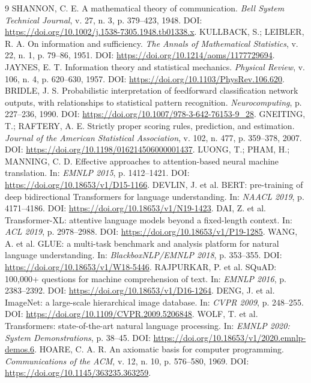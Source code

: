 \begin{thebibliography}{9}
 SHANNON, C. E. A mathematical theory of communication. \textit{Bell System Technical Journal}, v. 27, n. 3, p. 379--423, 1948. DOI: \url{https://doi.org/10.1002/j.1538-7305.1948.tb01338.x}.
 KULLBACK, S.; LEIBLER, R. A. On information and sufficiency. \textit{The Annals of Mathematical Statistics}, v. 22, n. 1, p. 79--86, 1951. DOI: \url{https://doi.org/10.1214/aoms/1177729694}.
 JAYNES, E. T. Information theory and statistical mechanics. \textit{Physical Review}, v. 106, n. 4, p. 620--630, 1957. DOI: \url{https://doi.org/10.1103/PhysRev.106.620}.
 BRIDLE, J. S. Probabilistic interpretation of feedforward classification network outputs, with relationships to statistical pattern recognition. \textit{Neurocomputing}, p. 227--236, 1990. DOI: \url{https://doi.org/10.1007/978-3-642-76153-9_28}.
 GNEITING, T.; RAFTERY, A. E. Strictly proper scoring rules, prediction, and estimation. \textit{Journal of the American Statistical Association}, v. 102, n. 477, p. 359--378, 2007. DOI: \url{https://doi.org/10.1198/016214506000001437}.
 LUONG, T.; PHAM, H.; MANNING, C. D. Effective approaches to attention-based neural machine translation. In: \textit{EMNLP 2015}, p. 1412--1421. DOI: \url{https://doi.org/10.18653/v1/D15-1166}.
 DEVLIN, J. et al. BERT: pre-training of deep bidirectional Transformers for language understanding. In: \textit{NAACL 2019}, p. 4171--4186. DOI: \url{https://doi.org/10.18653/v1/N19-1423}.
 DAI, Z. et al. Transformer-XL: attentive language models beyond a fixed-length context. In: \textit{ACL 2019}, p. 2978--2988. DOI: \url{https://doi.org/10.18653/v1/P19-1285}.
 WANG, A. et al. GLUE: a multi-task benchmark and analysis platform for natural language understanding. In: \textit{BlackboxNLP/EMNLP 2018}, p. 353--355. DOI: \url{https://doi.org/10.18653/v1/W18-5446}.
 RAJPURKAR, P. et al. SQuAD: 100,000+ questions for machine comprehension of text. In: \textit{EMNLP 2016}, p. 2383--2392. DOI: \url{https://doi.org/10.18653/v1/D16-1264}.
 DENG, J. et al. ImageNet: a large-scale hierarchical image database. In: \textit{CVPR 2009}, p. 248--255. DOI: \url{https://doi.org/10.1109/CVPR.2009.5206848}.
 WOLF, T. et al. Transformers: state-of-the-art natural language processing. In: \textit{EMNLP 2020: System Demonstrations}, p. 38--45. DOI: \url{https://doi.org/10.18653/v1/2020.emnlp-demos.6}.
 HOARE, C. A. R. An axiomatic basis for computer programming. \textit{Communications of the ACM}, v. 12, n. 10, p. 576--580, 1969. DOI: \url{https://doi.org/10.1145/363235.363259}.

\end{thebibliography}
